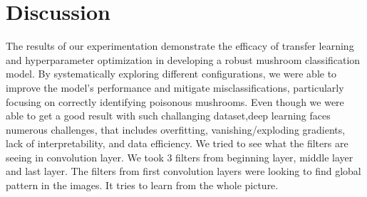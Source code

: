 \section{Discussion}

The results of our experimentation demonstrate the efficacy of transfer learning and hyperparameter optimization in developing a robust mushroom classification model. By systematically exploring different configurations, we were able to improve the model's performance and mitigate misclassifications, particularly focusing on correctly identifying poisonous mushrooms.
Even though we were able to get a good result with such challanging dataset,deep learning faces numerous challenges, that includes overfitting, vanishing/exploding gradients, lack of interpretability, and data efficiency\cite{alzubaidi2021review}. We tried to see what the filters are seeing in convolution layer. We took 3 filters from beginning layer, middle layer and last layer.
The filters from first convolution layers were looking to find global pattern in the images. It tries to learn from the whole picture.

